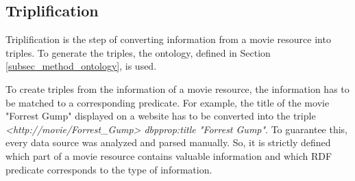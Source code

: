 \subsection{Triplification}
\label{subsec_method_triplification}

Triplification is the step of converting information from a movie resource into triples.
To generate the triples, the ontology, defined in Section \ref{subsec_method_ontology}, is used.

To create triples from the information of a movie resource, the information has to be matched to a corresponding predicate.
For example, the title of the movie "Forrest Gump" displayed on a website has to be converted into the triple \emph{<http://movie/Forrest\_Gump> dbpprop:title "Forrest Gump"}.
To guarantee this, every data source was analyzed and parsed manually.
So, it is strictly defined which part of a movie resource contains valuable information and which RDF predicate corresponds to the type of information.